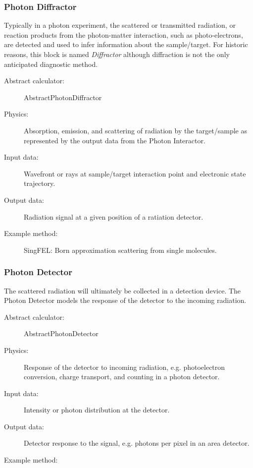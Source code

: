 \documentclass[a4paper]{article}
\begin{document}
\subsubsection{Photon Diffractor}
Typically in a photon experiment, the scattered or transmitted radiation, or reaction products from the photon-matter
interaction, such as photo-electrons, are detected and used to infer information about the sample/target. For historic reasons, this block is named
\textit{Diffractor} although diffraction is not the only anticipated diagnostic method.
\begin{description}
  \item[Abstract calculator:] AbstractPhotonDiffractor
  \item[Physics:] Absorption, emission, and scattering of radiation by the target/sample as represented by the output data from the Photon Interactor.
  \item[Input data:] Wavefront or rays at sample/target interaction point and electronic state trajectory.
  \item[Output data:] Radiation signal at a given position of a ratiation detector.
  \item[Example method:] SingFEL: Born approximation scattering from single molecules.
\end{description}

\subsubsection{Photon Detector}
The scattered radiation will ultimately  be collected in a detection device. The Photon Detector models the response of the detector to the incoming
radiation.
\begin{description}
  \item[Abstract calculator:] AbstractPhotonDetector
  \item[Physics:] Response of the detector to incoming radiation, e.g. photoelectron conversion, charge transport, and counting in a photon detector.
  \item[Input data:] Intensity or photon distribution at the detector.
  \item[Output data:] Detector response to the signal, e.g. photons per pixel in an area detector.
  \item[Example method:]
\end{description}
\end{document}
